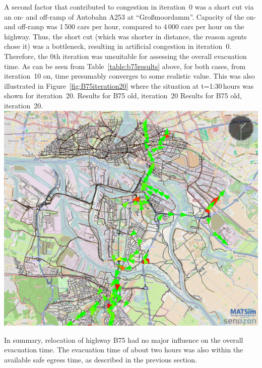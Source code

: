 {}
%
A second factor that contributed to congestion in iteration~0 was a short cut via an on- and off-ramp of Autobahn A253 at ``Gro{\ss}moordamm''. Capacity of the on- and off-ramp was 1\,500 cars per hour, compared to 4\,000 cars per hour on the highway. Thus, the short cut (which was shorter in distance, the reason agents chose it) was a bottleneck, resulting in artificial congestion in iteration~0.
Therefore, the 0th iteration was unsuitable for assessing the overall evacuation time. As can be seen from Table~\ref{table:b75results} above, for both cases, from iteration~10 on, time presumably converges to some realistic value. This was also illustrated in Figure~\ref{fig:B75iteration20} where the situation at t=1:30\,hours was shown for iteration~20.
%
\createfigure%
{Results for B75 old, iteration~20}%
{Results for B75 old, iteration~20.}%
{\label{fig:B75iteration20}}%
{\includegraphics[width=0.7\linewidth]{scenarios/figures/B75iteration20}}%
{}

In summary, relocation of highway B75 had no major influence on the overall evacuation time. The evacuation time of about two hours was also within the available safe egress time, as described in the previous section. 

